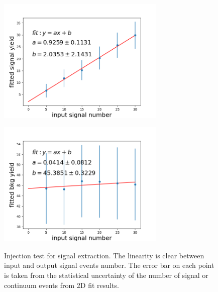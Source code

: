 \begin{figure}[htpb]
	\begin{minipage}[b]{0.5\linewidth}
		\centering 
		\includegraphics[height=6cm]{figures/inject_line_sig}
		\label{}
	\end{minipage}
	\begin{minipage}[b]{0.5\linewidth}
		\centering 
		\includegraphics[height=6cm]{figures/inject_line_bkg}
		\label{}
	\end{minipage}
	\caption{Injection test for signal extraction. The linearity is clear between input and output signal events number. The error bar on each point is taken from the statistical uncertainty of the number of signal or continuum events from 2D fit results.}
	\label{fig:2Dinjectline}
\end{figure}

